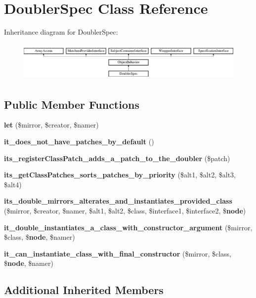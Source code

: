 \section{Doubler\+Spec Class Reference}
\label{classspec_1_1_prophecy_1_1_doubler_1_1_doubler_spec}
Inheritance diagram for Doubler\+Spec\+:\begin{figure}[H]
\begin{center}
\leavevmode
\includegraphics[height=1.953488cm]{classspec_1_1_prophecy_1_1_doubler_1_1_doubler_spec}
\end{center}
\end{figure}
\subsection*{Public Member Functions}
\begin{DoxyCompactItemize}
\item 
{\bf let} (\$mirror, \$creator, \$namer)
\item 
{\bf it\+\_\+does\+\_\+not\+\_\+have\+\_\+patches\+\_\+by\+\_\+default} ()
\item 
{\bf its\+\_\+register\+Class\+Patch\+\_\+adds\+\_\+a\+\_\+patch\+\_\+to\+\_\+the\+\_\+doubler} (\$patch)
\item 
{\bf its\+\_\+get\+Class\+Patches\+\_\+sorts\+\_\+patches\+\_\+by\+\_\+priority} (\$alt1, \$alt2, \$alt3, \$alt4)
\item 
{\bf its\+\_\+double\+\_\+mirrors\+\_\+alterates\+\_\+and\+\_\+instantiates\+\_\+provided\+\_\+class} (\$mirror, \$creator, \$namer, \$alt1, \$alt2, \$class, \$interface1, \$interface2, \${\bf node})
\item 
{\bf it\+\_\+double\+\_\+instantiates\+\_\+a\+\_\+class\+\_\+with\+\_\+constructor\+\_\+argument} (\$mirror, \$class, \${\bf node}, \$namer)
\item 
{\bf it\+\_\+can\+\_\+instantiate\+\_\+class\+\_\+with\+\_\+final\+\_\+constructor} (\$mirror, \$class, \${\bf node}, \$namer)
\end{DoxyCompactItemize}
\subsection*{Additional Inherited Members}


